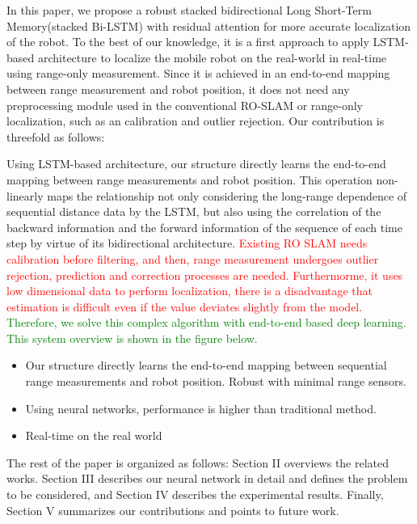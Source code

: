 \documentclass[letterpaper, 10 pt, conference]{ieeeconf}  %
\begin{document}
In this paper, we propose a robust stacked bidirectional Long Short-Term Memory(stacked Bi-LSTM) with residual attention for more accurate localization of the robot. To the best of our knowledge, it is a first approach to apply LSTM-based architecture to localize the mobile robot on the real-world in real-time using range-only measurement. Since it is achieved in an end-to-end mapping between range measurement and robot position, it does not need any preprocessing module used in the conventional RO-SLAM or range-only localization, such as an calibration and outlier rejection. Our contribution is threefold as follows:

 Using LSTM-based architecture, our structure directly learns the end-to-end mapping between range measurements and robot position. This operation non-linearly maps the relationship not only considering the long-range dependence of sequential distance data by the LSTM, but also using the correlation of the backward information and the forward information of the sequence of each time step by virtue of its bidirectional architecture. \textcolor{red}{Existing RO SLAM needs calibration before filtering, and then, range measurement undergoes outlier rejection, prediction and correction processes are needed.	Furthermorme, it uses low dimensional data to perform localization, there is a disadvantage that estimation is difficult even if the value deviates slightly from the model.} \textcolor{green}{Therefore, we solve this complex algorithm with end-to-end based deep learning. This system overview is shown in the figure below.}

\begin{itemize}
	\item Our structure directly learns the end-to-end mapping between sequential range measurements and robot position. Robust with minimal range sensors.
	\item Using neural networks, performance is higher than traditional method.
	\item Real-time on the real world
	 
\end{itemize}

The rest of the paper is organized as follows: Section II overviews the related works. Section III describes our neural network in detail and defines the problem to be considered, and Section IV describes the experimental results. Finally, Section V summarizes our contributions and points to future work.
\end{document}
